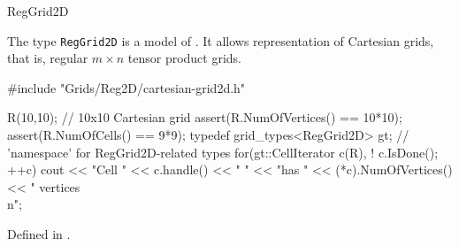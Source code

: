 \begin{Label}{RegGrid2D}
\end{Label}


The type {\tt RegGrid2D} is a model of .
It allows representation of Cartesian grids, that is, regular $m \times n$
tensor product grids.


\begin{example}
#include "Grids/Reg2D/cartesian-grid2d.h"

 R(10,10);  // 10x10 Cartesian grid
assert(R.NumOfVertices() == 10*10);
assert(R.NumOfCells()    == 9*9);
typedef grid\_types<RegGrid2D> gt; // 'namespace' for RegGrid2D-related types 
for(gt::CellIterator c(R), ! c.IsDone(); ++c)
  cout << "Cell " << c.handle() << "  "
       << "has "  << (*c).NumOfVertices() << " vertices\\n";
\end{example}


Defined in 
.
  
\\
\\
\\
\\

